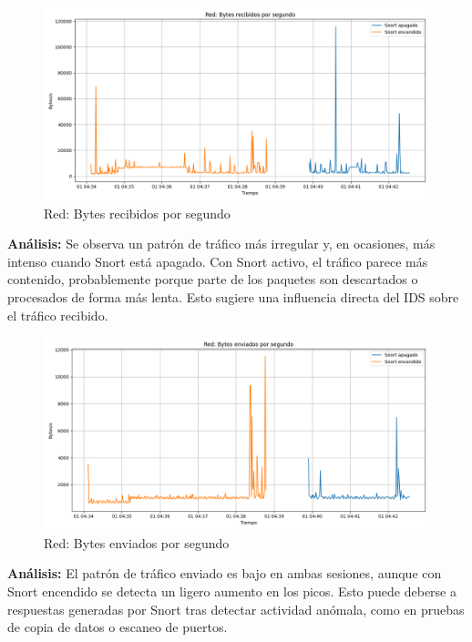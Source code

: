 \documentclass[11pt,a4paper,twoside]{report}
\begin{document}
\begin{figure}[H]
	\centering
	\includegraphics[width=\textwidth]{graficas/net_recv.png}
	\caption{Red: Bytes recibidos por segundo}
\end{figure}
\textbf{Análisis:} Se observa un patrón de tráfico más irregular y, en ocasiones, más intenso cuando Snort está apagado. Con Snort activo, el tráfico parece más contenido, probablemente porque parte de los paquetes son descartados o procesados de forma más lenta. Esto sugiere una influencia directa del IDS sobre el tráfico recibido.

\begin{figure}[H]
	\centering
	\includegraphics[width=\textwidth]{graficas/net_send.png}
	\caption{Red: Bytes enviados por segundo}
\end{figure}
\textbf{Análisis:} El patrón de tráfico enviado es bajo en ambas sesiones, aunque con Snort encendido se detecta un ligero aumento en los picos. Esto puede deberse a respuestas generadas por Snort tras detectar actividad anómala, como en pruebas de copia de datos o escaneo de puertos.
\end{document}

